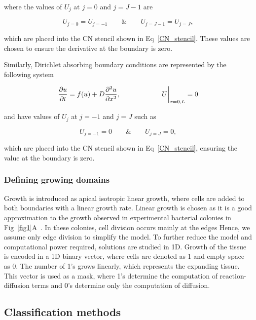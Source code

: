 where the values of $U_{j}$ at $j=0$ and $j=J-1$ are

\begin{equation}
    U_{j=0} = U_{j=-1}  \quad \quad \&  \quad \quad  U_{j=J-1} = U_{j=J},
\end{equation}

which are placed into the CN stencil shown in Eq~\ref{CN_stencil}.
These values are chosen to ensure the derivative at the boundary is zero.

Similarly, Dirichlet absorbing boundary conditions are represented by the following system

\begin{equation}
    \frac{\partial u}{\partial t} =  f(u) + D\frac{\partial^{2} {u}}{\partial {x}^{2}},   \quad \quad \quad \quad \quad \quad U\biggr\rvert_{x=0,L}=0
\end{equation}

and have values of $U_{j}$ at $j=-1$ and $j=J$ such as

\begin{equation}
    U_{j=-1} = 0  \quad \quad \&  \quad \quad  U_{j=J} = 0,
\end{equation}

which are placed into the CN stencil shown in Eq~\ref{CN_stencil},
ensuring the value at the boundary is zero.


\subsubsection*{Defining growing domains}
Growth is introduced as apical isotropic linear growth, where cells are added to both boundaries with a linear growth rate.
Linear growth is chosen as it is a good approximation to the growth observed in experimental bacterial colonies in Fig~\ref{fig1}A~\parencite{Oliver2023}.
In these colonies, cell division occurs mainly at the edges Hence, we assume only edge division to simplify the model.
To further reduce the model and computational power required, solutions are studied in 1D.
Growth of the tissue is encoded in a 1D binary vector, where cells are denoted as 1 and empty space as 0.
The number of 1's grows linearly, which represents the expanding tissue.
This vector is used as a mask, where 1's determine the computation of reaction-diffusion terms and 0's determine only the computation of diffusion.


\subsection*{Classification methods}\label{classification}

